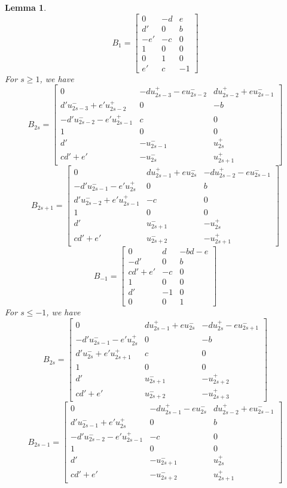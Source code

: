 \documentclass{amsart}
\newtheorem{lemma}[theorem]{Lemma}
\numberwithin{theorem}{section}
\begin{document}
  \begin{lemma}
    \[B_1=\left[\begin{array}{ccc} 0 & -d & e \\ d' & 0 & b\\ -e' & -c & 0\\ 1 & 0 & 0\\ 0 & 1 & 0\\ e' & c & -1\end{array}\right]\]
    For $s\ge 1$, we have 
    \[B_{2s}=\left[\begin{array}{ccc} 0 & -du_{2s-3}^+ - eu_{2s-2}^- & du_{2s-2}^+ + eu_{2s-1}^- \\ d'u_{2s-3}^- + e'u_{2s-2}^+ & 0 & -b\\ -d'u_{2s-2}^- - e'u_{2s-1}^+ &  c & 0\\ 1 & 0 & 0\\ d' & -u_{2s-1}^- & u_{2s}^+ \\ cd'+e' & -u_{2s}^- & u_{2s+1}^+\end{array}\right]\]
    \[B_{2s+1}=\left[\begin{array}{ccc} 0 & du_{2s-1}^+ + eu_{2s}^- & -du_{2s-2}^+ - eu_{2s-1}^- \\ -d'u_{2s-1}^- - e'u_{2s}^+ & 0 & b\\ d'u_{2s-2}^- + e'u_{2s-1}^+ &  -c & 0\\ 1 & 0 & 0\\ d' & u_{2s+1}^- & -u_{2s}^+ \\ cd'+e' & u_{2s+2}^- & -u_{2s+1}^+\end{array}\right]\]
    \[B_{-1}=\left[\begin{array}{ccc} 0 & d & -bd-e \\ -d' & 0 & b\\ cd'+e' & -c & 0\\ 1 & 0 & 0\\ d' & -1 & 0\\ 0 & 0 & 1\end{array}\right]\]
    For $s\le -1$, we have
    \[B_{2s}=\left[\begin{array}{ccc} 0 & du_{2s-1}^+ + eu_{2s}^- & -du_{2s}^+ - eu_{2s+1}^- \\ -d'u_{2s-1}^- - e'u_{2s}^+ & 0 & -b\\ d'u_{2s}^- + e'u_{2s+1}^+ &  c & 0\\ 1 & 0 & 0\\ d' & u_{2s+1}^- & -u_{2s+2}^+ \\ cd'+e' & u_{2s+2}^- & -u_{2s+3}^+\end{array}\right]\]
    \[B_{2s-1}=\left[\begin{array}{ccc} 0 & -du_{2s-1}^+ - eu_{2s}^- & du_{2s-2}^+ + eu_{2s-1}^- \\ d'u_{2s-1}^- + e'u_{2s}^+ & 0 & b\\ -d'u_{2s-2}^- - e'u_{2s-1}^+ &  -c & 0\\ 1 & 0 & 0\\ d' & -u_{2s+1}^- & u_{2s}^+ \\ cd'+e' & -u_{2s+2}^- & u_{2s+1}^+\end{array}\right]\]
  \end{lemma}
\end{document}
